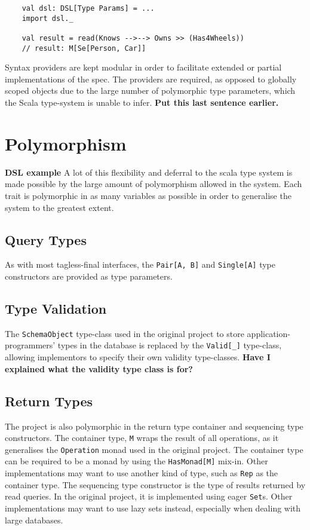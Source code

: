 \documentclass{report}
\newcommand \2[0]{\textbf{2}}
\newcommand \3[0]{\textbf{3}}
\newcommand{\todo}[1]{\textbf{#1}}
\begin{document}
\begin{verbatim}
    val dsl: DSL[Type Params] = ...
    import dsl._

    val result = read(Knows -->--> Owns >> (Has4Wheels))
    // result: M[Se[Person, Car]]
\end{verbatim}

Syntax providers are kept modular in order to facilitate extended or partial implementations of the spec. The providers are required, as opposed to globally scoped objects due to the large number of polymorphic type parameters, which the Scala type-system is unable to infer. \todo{Put this last sentence earlier.}


\section{Polymorphism}
\todo{DSL example}
A lot of this flexibility and deferral to the scala type system is made possible by the large amount of polymorphism allowed in the system. Each trait is polymorphic in as many variables as possible in order to generalise the system to the greatest extent.

\subsection{Query Types}
As with most tagless-final interfaces, the \texttt{Pair[A, B]} and \texttt{Single[A]} type constructors are provided as type parameters.
\subsection{Type Validation}
The \texttt{SchemaObject} type-class used in the original project to store application-programmers' types in the database is replaced by the \texttt{Valid[_]} type-class, allowing implementors to specify their own validity type-classes.
\todo{Have I explained what the validity type class is for?}
\subsection{Return Types}
The project is also polymorphic in the return type container and sequencing type constructors. The container type, \texttt{M} wraps the result of all operations, as it generalises the \texttt{Operation} monad used in the original project. The container type can be required to be a monad by using the \texttt{HasMonad[M]} mix-in. Other implementations may want to use another kind of type, such as \texttt{Rep} as the container type. The sequencing type constructor is the type of results returned by read queries. In the original project, it is implemented using eager \texttt{Set}s. Other implementations may want to use lazy sets instead, especially when dealing with large databases.
\end{document}
